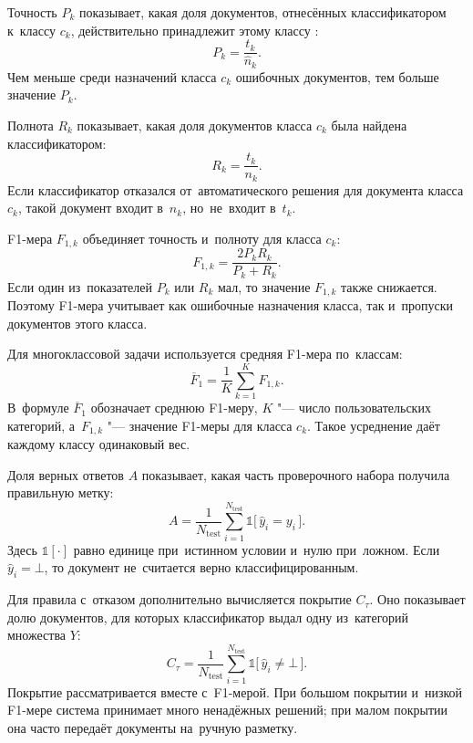 Точность \( P_k \) показывает, какая доля документов, отнесённых классификатором
к~классу \( c_k \), действительно принадлежит этому классу
\autocite{Sokolova2009Metrics,Manning2008IR}:
\begin{equation}
    \label{eq:precision}
    P_k = \frac{t_k}{\hat{n}_k}.
\end{equation}
Чем меньше среди назначений класса \( c_k \) ошибочных документов, тем больше
значение \( P_k \).

Полнота \( R_k \) показывает, какая доля документов класса \( c_k \) была найдена
классификатором:
\begin{equation}
    \label{eq:recall}
    R_k = \frac{t_k}{n_k}.
\end{equation}
Если классификатор отказался от~автоматического решения для документа класса
\( c_k \), такой документ входит в~\( n_k \), но~не~входит в~\( t_k \).

F1-мера \( F_{1,k} \) объединяет точность и~полноту для класса \( c_k \):
\begin{equation}
    \label{eq:f1}
    F_{1,k} =
    \frac{2 P_k R_k}{P_k + R_k}.
\end{equation}
Если один из~показателей \( P_k \) или \( R_k \) мал, то значение \( F_{1,k} \)
также снижается. Поэтому F1-мера учитывает как ошибочные назначения класса, так
и~пропуски документов этого класса.

Для многоклассовой задачи используется средняя F1-мера по~классам:
\begin{equation}
    \label{eq:macro-f1}
    \overline{F}_1 =
    \frac{1}{K}\sum_{k=1}^{K} F_{1,k}.
\end{equation}
В~формуле \( \overline{F}_1 \) обозначает среднюю F1-меру, \( K \) "--- число
пользовательских категорий, а~\( F_{1,k} \) "--- значение F1-меры для класса
\( c_k \). Такое усреднение даёт каждому классу одинаковый вес.

Доля верных ответов \( A \) показывает, какая часть проверочного набора получила
правильную метку:
\begin{equation}
    \label{eq:accuracy}
    A =
    \frac{1}{N_{\mathrm{test}}}\sum_{i=1}^{N_{\mathrm{test}}}
    \mathbb{1}\bigl[\,\hat{y}_i = y_i\,\bigr].
\end{equation}
Здесь \( \mathbb{1}[\cdot] \) равно единице при~истинном условии и~нулю
при~ложном. Если \( \hat{y}_i=\bot \), то документ не~считается верно
классифицированным.

Для правила с~отказом дополнительно вычисляется покрытие \( C_{\tau} \). Оно
показывает долю документов, для которых классификатор выдал одну из~категорий
множества \( Y \):
\begin{equation}
    \label{eq:coverage}
    C_{\tau} =
    \frac{1}{N_{\mathrm{test}}}\sum_{i=1}^{N_{\mathrm{test}}}
    \mathbb{1}\bigl[\,\hat{y}_i \neq \bot\,\bigr].
\end{equation}
Покрытие рассматривается вместе с~F1-мерой. При большом покрытии и~низкой
F1-мере система принимает много ненадёжных решений; при малом покрытии она
часто передаёт документы на~ручную разметку.

